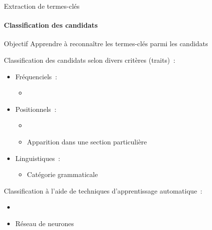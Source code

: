  \begin{frame}{Extraction de termes-clés}\framesubtitle{Classification des candidats}
    \begin{block}{Objectif}
      Apprendre à reconnaître les termes-clés parmi les candidats
    \end{block}

    \vspace{1em}

    Classification des candidats selon divers critères (traits)~:
    \begin{itemize}
      \item{Fréquenciels~:}
      \begin{itemize}
        \item{}
      \end{itemize}
      \item{Positionnels~:}
      \begin{itemize}
        \item{}
        \item{Apparition dans une section
              particulière~\cite{nguyen2007keadocumentstructure}}
      \end{itemize}
      \item{Linguistiques~:}
      \begin{itemize}
        \item{Catégorie grammaticale~\cite{nguyen2007keadocumentstructure}}
      \end{itemize}
    \end{itemize}

    \vspace{1em}

    Classification à l'aide de techniques d'apprentissage automatique~:
    \begin{itemize}
      \item{}
      \item{Réseau de neurones~\cite{sarkar2010neuralnetwork}}
    \end{itemize}
  \end{frame}

